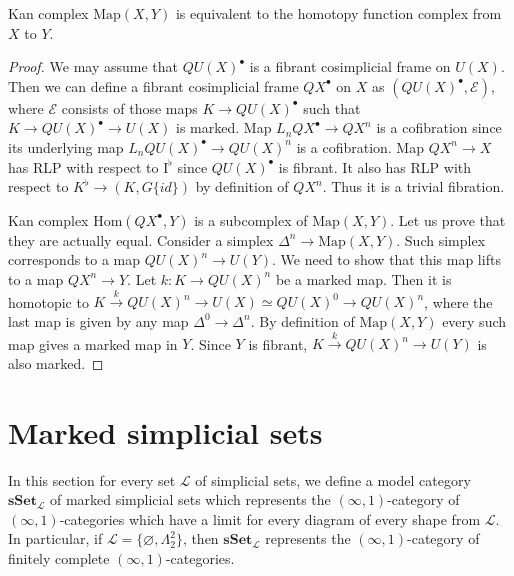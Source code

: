 \documentclass[reqno]{amsart}
\theoremstyle{definition}
\theoremstyle{remark}
\newcommand{\cat}[1]{\mathbf{#1}}
\newcommand{\sSet}{\cat{sSet}}
\newcommand{\Hom}{\mathrm{Hom}}
\newcommand{\Map}{\mathrm{Map}}
\newcommand{\I}{\mathrm{I}}
\numberwithin{figure}{section}
\begin{document}
\begin{lem}
Kan complex $\Map(X,Y)$ is equivalent to the homotopy function complex from $X$ to $Y$.
\end{lem}
\begin{proof}
We may assume that $QU(X)^\bullet$ is a fibrant cosimplicial frame on $U(X)$.
Then we can define a fibrant cosimplicial frame $QX^\bullet$ on $X$ as $(QU(X)^\bullet,\mathcal{E})$,
where $\mathcal{E}$ consists of those maps $K \to QU(X)^\bullet$ such that $K \to QU(X)^\bullet \to U(X)$ is marked.
Map $L_n QX^\bullet \to QX^n$ is a cofibration since its underlying map $L_n QU(X)^\bullet \to QU(X)^n$ is a cofibration.
Map $QX^n \to X$ has RLP with respect to $\I^\flat$ since $QU(X)^\bullet$ is fibrant.
It also has RLP with respect to $K^\flat \to (K, G \{id\})$ by definition of $QX^n$.
Thus it is a trivial fibration.

Kan complex $\Hom(QX^\bullet,Y)$ is a subcomplex of $\Map(X,Y)$.
Let us prove that they are actually equal.
Consider a simplex $\Delta^n \to \Map(X,Y)$.
Such simplex corresponds to a map $QU(X)^n \to U(Y)$.
We need to show that this map lifts to a map $QX^n \to Y$.
Let $k : K \to QU(X)^n$ be a marked map.
Then it is homotopic to $K \xrightarrow{k} QU(X)^n \to U(X) \simeq QU(X)^0 \to QU(X)^n$,
where the last map is given by any map $\Delta^0 \to \Delta^n$.
By definition of $\Map(X,Y)$ every such map gives a marked map in $Y$.
Since $Y$ is fibrant, $K \xrightarrow{k} QU(X)^n \to U(Y)$ is also marked.
\end{proof}

\section{Marked simplicial sets}
\label{sec:marked-simp-sets}

In this section for every set $\mathcal{L}$ of simplicial sets, we define a model category $\sSet_\mathcal{L}$ of marked simplicial sets
which represents the $(\infty,1)$-category of $(\infty,1)$-categories which have a limit for every diagram of every shape from $\mathcal{L}$.
In particular, if $\mathcal{L} = \{ \varnothing, \Lambda^2_2 \}$, then $\sSet_\mathcal{L}$ represents the $(\infty,1)$-category of finitely complete $(\infty,1)$-categories.
\end{document}
